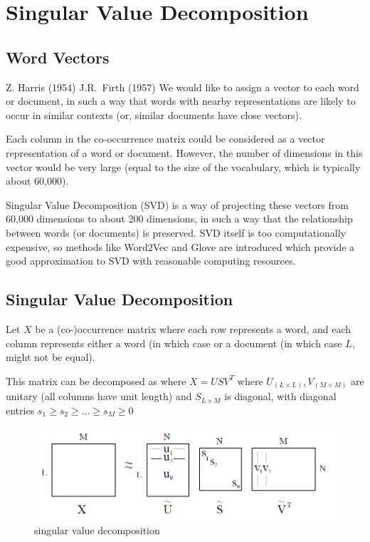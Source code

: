 \documentclass[11pt]{article}
\begin{document}
\section{Singular Value Decomposition}\label{sec:singular-value-decomposition}
\subsection{Word Vectors}\label{subsec:word-vectors}
 Z. Harris (1954)
 J.R.\ Firth (1957)
We would like to assign a vector to each word or document, in such a way that
words with nearby representations are likely to occur in similar contexts (or,
similar documents have close vectors).

Each column in the co-occurrence matrix could be considered as a vector
representation of a word or document.
However, the number of dimensions in this vector would be very large (equal to
the size of the vocabulary, which is typically about 60,000).

Singular Value Decomposition (SVD) is a way of projecting these vectors from
60,000 dimensions to about 200 dimensions, in such a way that the relationship
between words (or documents) is preserved.
SVD itself is too computationally expensive, so methods like Word2Vec and Glove
are introduced which provide a good approximation to SVD with reasonable
computing resources.

\subsection{Singular Value Decomposition}\label{subsec:singular-value-decomposition2}
Let $X$ be a (co-)occurrence matrix where each row represents a word, and each
column represents either a word (in which case  or a document (in which case
$L$, might not be equal).

This matrix  can be decomposed as where $X = USV^T$ where $U_{(L \times L)}, V_{(M \times M)}$ are unitary (all columns have unit length) and $S_{L \times M}$ is diagonal, with diagonal entries $s_1 \geq s_2 \geq \dots \geq s_M \geq 0$

\begin{figure}[H]
    \centering
    \includegraphics{../out/images/singular-value-decomposition}
    \caption[singular value decomposition]{singular value decomposition}
    \label{fig:singular value decomposition}
\end{figure}
\end{document}
